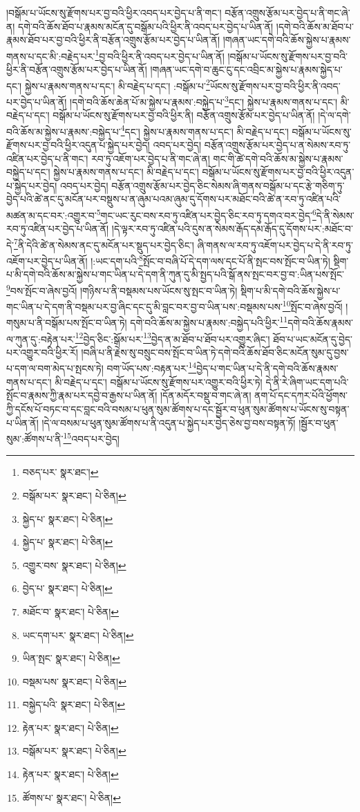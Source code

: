 །བསྒོམ་པ་ཡོངས་སུ་རྫོགས་པར་བྱ་བའི་ཕྱིར་འབད་པར་བྱེད་པ་ནི་གང་། བརྩོན་འགྲུས་རྩོམ་པར་བྱེད་པ་ནི་གང་ཞེ་ན། དགེ་བའི་ཆོས་ཐོབ་པ་རྣམས་མངོན་དུ་བསྒོམ་པའི་ཕྱིར་ནི་འབད་པར་བྱེད་པ་ཡིན་ནོ། །དགེ་བའི་ཆོས་མ་ཐོབ་པ་རྣམས་ཐོབ་པར་བྱ་བའི་ཕྱིར་ནི་བརྩོན་འགྲུས་རྩོམ་པར་བྱེད་པ་ཡིན་ནོ། །གཞན་ཡང་དགེ་བའི་ཆོས་སྐྱེས་པ་རྣམས་གནས་པ་དང་མི་:བརྗེད་པར་\footnote{བཅད་པར་  སྣར་ཐང་། }བྱ་བའི་ཕྱིར་ནི་འབད་པར་བྱེད་པ་ཡིན་ནོ། །བསྒོམ་པ་ཡོངས་སུ་རྫོགས་པར་བྱ་བའི་ཕྱིར་ནི་བརྩོན་འགྲུས་རྩོམ་པར་བྱེད་པ་ཡིན་ནོ། །གཞན་ཡང་དགེ་བ་ཆུང་ངུ་དང་འབྲིང་མ་སྐྱེས་པ་རྣམས་སྐྱེད་པ་དང་། སྐྱེས་པ་རྣམས་གནས་པ་དང་། མི་བརྗེད་པ་དང་། :བསྒོམ་པ་\footnote{བསྒོམ་པར་  སྣར་ཐང་།  པེ་ཅིན། }ཡོངས་སུ་རྫོགས་པར་བྱ་བའི་ཕྱིར་ནི་འབད་པར་བྱེད་པ་ཡིན་ནོ། །དགེ་བའི་ཆོས་ཆེན་པོ་མ་སྐྱེས་པ་རྣམས་:བསྐྱེད་པ་\footnote{སྐྱེད་པ་  སྣར་ཐང་།  པེ་ཅིན། }དང་། སྐྱེས་པ་རྣམས་གནས་པ་དང་། མི་བརྗེད་པ་དང་། བསྒོམ་པ་ཡོངས་སུ་རྫོགས་པར་བྱ་བའི་ཕྱིར་ནི། བརྩོན་འགྲུས་རྩོམ་པར་བྱེད་པ་ཡིན་ནོ། །དེ་ལ་དགེ་བའི་ཆོས་མ་སྐྱེས་པ་རྣམས་:བསྐྱེད་པ་\footnote{སྐྱེད་པ་  སྣར་ཐང་།  པེ་ཅིན། }དང་། སྐྱེས་པ་རྣམས་གནས་པ་དང་། མི་བརྗེད་པ་དང་། བསྒོམ་པ་ཡོངས་སུ་རྫོགས་པར་བྱ་བའི་ཕྱིར་འདུན་པ་སྐྱེད་པར་བྱེད། འབད་པར་བྱེད། བརྩོན་འགྲུས་རྩོམ་པར་བྱེད་པ་ན་སེམས་རབ་ཏུ་འཛིན་པར་བྱེད་པ་ནི་གང་། རབ་ཏུ་འཇོག་པར་བྱེད་པ་ནི་གང་ཞེ་ན། གང་གི་ཚེ་དགེ་བའི་ཆོས་མ་སྐྱེས་པ་རྣམས་བསྐྱེད་པ་དང་། སྐྱེས་པ་རྣམས་གནས་པ་དང་། མི་བརྗེད་པ་དང་། བསྒོམ་པ་ཡོངས་སུ་རྫོགས་པར་བྱ་བའི་ཕྱིར་འདུན་པ་སྐྱེད་པར་བྱེད། འབད་པར་བྱེད། བརྩོན་འགྲུས་རྩོམ་པར་བྱེད་ཅིང་སེམས་ཞི་གནས་བསྒོམ་པ་དང་རྩེ་གཅིག་ཏུ་བྱེད་པའི་ཚེ་ནང་དུ་མངོན་པར་བསྡུས་པ་ན་ཞུམ་པའམ་ཞུམ་དུ་དོགས་པར་མཐོང་བའི་ཚེ་ན་རབ་ཏུ་འཛིན་པའི་མཚན་མ་དང་བར་:འགྱུར་བ་\footnote{འགྱུར་བས་  སྣར་ཐང་།  པེ་ཅིན། }གང་ཡང་རུང་བས་རབ་ཏུ་འཛིན་པར་བྱེད་ཅིང་རབ་ཏུ་དགའ་བར་བྱེད་\footnote{བྱེད་པ་  སྣར་ཐང་།  པེ་ཅིན། }དེ་ནི་སེམས་རབ་ཏུ་འཛིན་པར་བྱེད་པ་ཡིན་ནོ། །དེ་ལྟར་རབ་ཏུ་འཛིན་པའི་དུས་ན་སེམས་རྒོད་དམ་རྒོད་དུ་དོགས་པར་:མཐོང་བ་དེ་\footnote{མཐོང་བ་  སྣར་ཐང་།  པེ་ཅིན། }ནི་དེའི་ཚེ་ན་སེམས་ནང་དུ་མངོན་པར་སྡུད་པར་བྱེད་ཅིང་། ཞི་གནས་ལ་རབ་ཏུ་འཇོག་པར་བྱེད་པ་དེ་ནི་རབ་ཏུ་འཇོག་པར་བྱེད་པ་ཡིན་ནོ། །:ཡང་དག་པའི་\footnote{ཡང་དག་པར་  སྣར་ཐང་།  པེ་ཅིན། }སྤོང་བ་བཞི་པོ་དེ་དག་ལས་དང་པོ་ནི་སྤང་བས་སྤོང་བ་ཡིན་ཏེ། སྡིག་པ་མི་དགེ་བའི་ཆོས་མ་སྐྱེས་པ་གང་ཡིན་པ་དེ་དག་ནི་ཀུན་དུ་མི་སྤྱད་པའི་སྒོ་ནས་སྤང་བར་བྱ་བ་:ཡིན་པས་སྤོང་\footnote{ཡིན་སྤང་  སྣར་ཐང་།  པེ་ཅིན། }བས་སྤོང་བ་ཞེས་བྱའོ། །གཉིས་པ་ནི་བསྡམས་པས་ཡོངས་སུ་སྤང་བ་ཡིན་ཏེ། སྡིག་པ་མི་དགེ་བའི་ཆོས་སྐྱེས་པ་གང་ཡིན་པ་དེ་དག་ནི་བསྡམ་པར་བྱ་ཞིང་དང་དུ་མི་བླང་བར་བྱ་བ་ཡིན་པས་:བསྡམས་པས་\footnote{བསྡམ་པས་  སྣར་ཐང་།  པེ་ཅིན། }སྤོང་བ་ཞེས་བྱའོ། །གསུམ་པ་ནི་བསྒོམ་པས་སྤོང་བ་ཡིན་ཏེ། དགེ་བའི་ཆོས་མ་སྐྱེས་པ་རྣམས་:བསྐྱེད་པའི་ཕྱིར་\footnote{བསྐྱེད་པའི་  སྣར་ཐང་།  པེ་ཅིན། }དགེ་བའི་ཆོས་རྣམས་ལ་ཀུན་དུ་:བརྟེན་པར་\footnote{རྟེན་པར་  སྣར་ཐང་།  པེ་ཅིན། }བྱེད་ཅིང་:སྒོམ་པར་\footnote{བསྒོམ་པར་  སྣར་ཐང་།  པེ་ཅིན། }བྱེད་ན་མ་ཐོབ་པ་ཐོབ་པར་འགྱུར་ཞིང་། ཐོབ་པ་ཡང་མངོན་དུ་བྱེད་པར་འགྱུར་བའི་ཕྱིར་རོ། །བཞི་པ་ནི་རྗེས་སུ་བསྲུང་བས་སྤོང་བ་ཡིན་ཏེ་དགེ་བའི་ཆོས་ཐོབ་ཅིང་མངོན་སུམ་དུ་བྱས་པ་དག་ལ་བག་མེད་པ་སྤངས་ཏེ། བག་ཡོད་པས་:བརྟན་པར་\footnote{རྟེན་པར་  སྣར་ཐང་།  པེ་ཅིན། }བྱེད་པ་གང་ཡིན་པ་དེ་ནི་དགེ་བའི་ཆོས་རྣམས་གནས་པ་དང་། མི་བརྗེད་པ་དང་། བསྒོམ་པ་ཡོངས་སུ་རྫོགས་པར་འགྱུར་བའི་ཕྱིར་ཏེ། དེ་ནི་རེ་ཞིག་ཡང་དག་པའི་སྤོང་བ་རྣམས་ཀྱི་རྣམ་པར་དབྱེ་བ་རྒྱས་པ་ཡིན་ནོ། །དོན་མདོར་བསྡུ་བ་གང་ཞེ་ན། ནག་པོ་དང་དཀར་པོའི་ཕྱོགས་ཀྱི་དངོས་པོ་བཏང་བ་དང་བླང་བའི་བསམ་པ་ཕུན་སུམ་ཚོགས་པ་དང་སྦྱོར་བ་ཕུན་སུམ་ཚོགས་པ་ཡོངས་སུ་བསྟན་པ་ཡིན་ནོ། །དེ་ལ་བསམ་པ་ཕུན་སུམ་ཚོགས་པ་ནི་འདུན་པ་སྐྱེད་པར་བྱེད་ཅེས་བྱ་བས་བསྟན་ཏོ། །སྦྱོར་བ་ཕུན་སུམ་:ཚོགས་པ་ནི་\footnote{ཚོགས་པ་  སྣར་ཐང་།  པེ་ཅིན། }འབད་པར་བྱེད། 